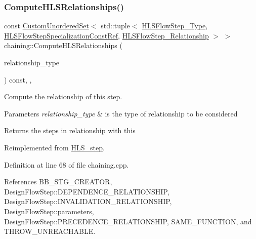 \subsubsection{\texorpdfstring{Compute\+H\+L\+S\+Relationships()}{ComputeHLSRelationships()}}
{\footnotesize\ttfamily const \hyperlink{classCustomUnorderedSet}{Custom\+Unordered\+Set}$<$ std\+::tuple$<$ \hyperlink{hls__step_8hpp_ada16bc22905016180e26fc7e39537f8d}{H\+L\+S\+Flow\+Step\+\_\+\+Type}, \hyperlink{hls__step_8hpp_a5fdd2edf290c196531d21d68e13f0e74}{H\+L\+S\+Flow\+Step\+Specialization\+Const\+Ref}, \hyperlink{hls__step_8hpp_a3ad360b9b11e6bf0683d5562a0ceb169}{H\+L\+S\+Flow\+Step\+\_\+\+Relationship} $>$ $>$ chaining\+::\+Compute\+H\+L\+S\+Relationships (\begin{DoxyParamCaption}\item[{const \hyperlink{classDesignFlowStep_a723a3baf19ff2ceb77bc13e099d0b1b7}{Design\+Flow\+Step\+::\+Relationship\+Type}}]{relationship\+\_\+type }\end{DoxyParamCaption}) const\hspace{0.3cm}{\ttfamily [override]}, {\ttfamily [protected]}, {\ttfamily [virtual]}}



Compute the relationship of this step. 


\begin{DoxyParams}{Parameters}
{\em relationship\+\_\+type} & is the type of relationship to be considered \\
\hline
\end{DoxyParams}
\begin{DoxyReturn}{Returns}
the steps in relationship with this 
\end{DoxyReturn}


Reimplemented from \hyperlink{classHLS__step_aed0ce8cca9a1ef18e705fc1032ad4de5}{H\+L\+S\+\_\+step}.



Definition at line 68 of file chaining.\+cpp.



References B\+B\+\_\+\+S\+T\+G\+\_\+\+C\+R\+E\+A\+T\+OR, Design\+Flow\+Step\+::\+D\+E\+P\+E\+N\+D\+E\+N\+C\+E\+\_\+\+R\+E\+L\+A\+T\+I\+O\+N\+S\+H\+IP, Design\+Flow\+Step\+::\+I\+N\+V\+A\+L\+I\+D\+A\+T\+I\+O\+N\+\_\+\+R\+E\+L\+A\+T\+I\+O\+N\+S\+H\+IP, Design\+Flow\+Step\+::parameters, Design\+Flow\+Step\+::\+P\+R\+E\+C\+E\+D\+E\+N\+C\+E\+\_\+\+R\+E\+L\+A\+T\+I\+O\+N\+S\+H\+IP, S\+A\+M\+E\+\_\+\+F\+U\+N\+C\+T\+I\+ON, and T\+H\+R\+O\+W\+\_\+\+U\+N\+R\+E\+A\+C\+H\+A\+B\+LE.

